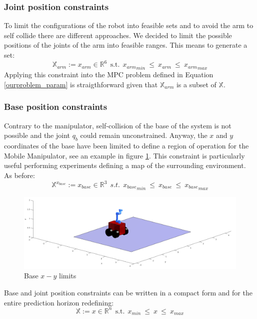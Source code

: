 \subsubsection*{Joint position constraints}
	To limit the configurations of the robot into feasible sets and to avoid the arm to self collide there are different approaches. We decided to limit the possible positions of the joints of the arm into feasible ranges. This means to generate a set:
	\begin{equation}
		\mathbb{X}_{arm}:=x_{arm} \in \mathbb{R}^{6}\ \ \text{s.t.}\ \  {x_{arm}}_{min}\ \leq\ x_{arm}\ \leq\ {x_{arm}}_{max} 
	\end{equation}
	Applying this constraint into the MPC problem defined in Equation \ref{ourproblem_param} is straigthforward given that $\mathbb{X}_{arm}$ is a subset of $\mathbb{X}$.
\subsubsection*{Base position constraints}
	Contrary to the manipulator, self-collision of the base of the system is not possible and the joint $q_b$ could remain unconstrained. Anyway, the $x$ and $y$ coordinates of the base have been limited to define a region of operation for the Mobile Manipulator, see an example in figure \ref{xy_limits}. This constraint is particularly useful performing experiments defining a map of the surrounding environment. As before: 
	\begin{equation}
		\mathbb{X}^{x_{base}}:=x_{base} \in \mathbb{R}^3\ \ s.t.\ \  {x_{base}}_{min}\ \leq\ x_{base}\ \leq\ {x_{base}}_{max} 
	\end{equation}

	\begin{figure}[h!]
	\centering
	\includegraphics[scale=0.25]{IMMAGINI/xy_limits.png}
	\caption{Base $x-y$ limits}
	\label{xy_limits}
	\end{figure}

	Base and joint position constraints can be written in a compact form and for the entire prediction horizon redefining: 
	\begin{equation}
	\mathbb{X}:= x \in \mathbb{R}^{n}\ \ \text{s.t.}\ \  {x}_{min}\ \leq\ x\ \leq\ {x}_{max}
	\end{equation}

